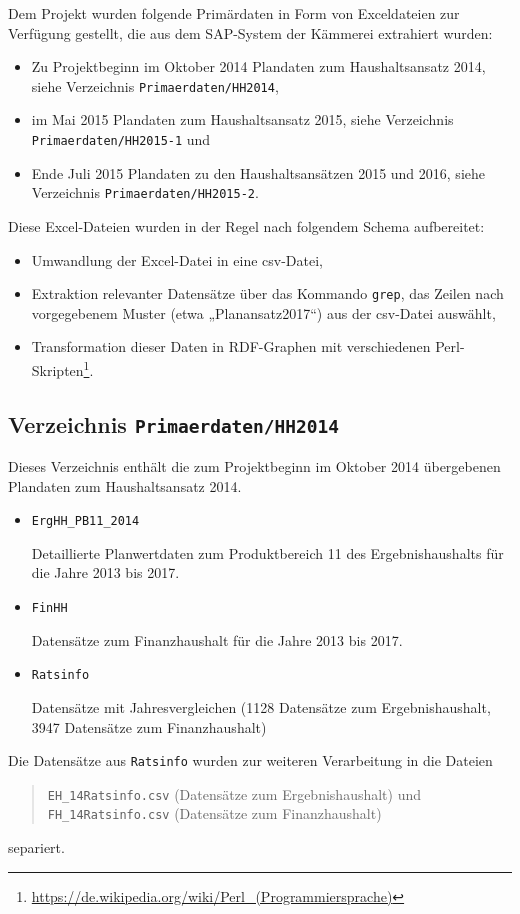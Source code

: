 \documentclass[a4paper,11pt,twoside]{article}
\begin{document}
Dem Projekt wurden folgende Primärdaten in Form von Exceldateien zur Verfügung
gestellt, die aus dem SAP-System der Kämmerei extrahiert wurden:
\begin{itemize}\raggedright
\item Zu Projektbeginn im Oktober 2014 Plandaten zum Haushaltsansatz 2014,
  siehe Verzeichnis \texttt{Primaerdaten/HH2014},
\item im Mai 2015 Plandaten zum Haushaltsansatz 2015, siehe Verzeichnis
  \texttt{Primaerdaten/HH2015-1} und
\item Ende Juli 2015 Plandaten zu den Haushaltsansätzen 2015 und 2016, siehe
  Verzeichnis \texttt{Primaerdaten/HH2015-2}.
\end{itemize}
Diese Excel-Dateien wurden in der Regel nach folgendem Schema aufbereitet:
\begin{itemize}
\item Umwandlung der Excel-Datei in eine csv-Datei,
\item Extraktion relevanter Datensätze über das Kommando \texttt{grep}, das
  Zeilen nach vorgegebenem Muster (etwa „Planansatz2017“) aus der csv-Datei
  auswählt,
\item Transformation dieser Daten in RDF-Graphen mit verschiedenen
  Perl-Skripten\footnote{\url{https://de.wikipedia.org/wiki/Perl_(Programmiersprache)}}.
\end{itemize}
\subsection{Verzeichnis \texttt{Primaerdaten/HH2014}}
Dieses Verzeichnis enthält die zum Projektbeginn im Oktober 2014 übergebenen
Plandaten zum Haushaltsansatz 2014.
\begin{itemize}
\item \texttt{ErgHH\_PB11\_2014}

Detaillierte Planwertdaten zum Produktbereich 11 des Ergebnishaushalts für die
Jahre 2013 bis 2017. 

\item \texttt{FinHH} 

Datensätze zum Finanzhaushalt für die Jahre 2013 bis 2017.

\item \texttt{Ratsinfo} 

Datensätze mit Jahresvergleichen (1128 Datensätze zum Ergebnishaushalt, 3947
Datensätze zum Finanzhaushalt)
\end{itemize}
Die Datensätze aus \texttt{Ratsinfo} wurden zur weiteren Verarbeitung in
die Dateien 
\begin{quote}
  \texttt{EH\_14Ratsinfo.csv} (Datensätze zum Ergebnishaushalt) und\\
  \texttt{FH\_14Ratsinfo.csv} (Datensätze zum Finanzhaushalt)
\end{quote}
separiert. 
\end{document}
